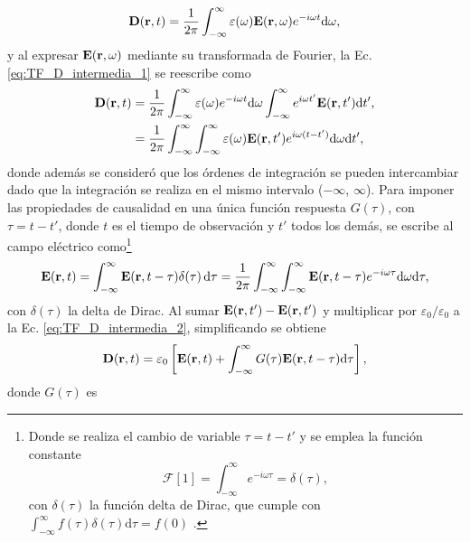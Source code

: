 %
\begin{equation}
	\vb{D}(\vb{r},t)=\frac{1}{2\pi}\int_{-\infty}^{\infty}\varepsilon(\omega)\vb{E}(\vb{r},\omega)e^{-i\omega t}\text{d}\omega,\label{eq:TF_D_intermedia_1}
\end{equation}
%
y al expresar $\vb{E}(\vb{r},\omega)$ mediante su transformada de Fourier, la Ec. \eqref{eq:TF_D_intermedia_1} se reescribe como
%
\begin{align}
	\vb{D}(\vb{r},t)&=\frac{1}{2\pi}\int_{-\infty}^{\infty}\varepsilon(\omega)e^{-i\omega t}\text{d}\omega\int_{-\infty}^{\infty}e^{i\omega t'}\vb{E}(\vb{r},t')\text{d}t',\\
	&=\frac{1}{2\pi}\int_{-\infty}^{\infty}\int_{-\infty}^{\infty}\varepsilon(\omega)\vb{E}(\vb{r},t') e^{i\omega (t-t')} \text{d}\omega \text{d}t',
	\label{eq:TF_D_intermedia_2}
\end{align}
%
donde además se consideró que los órdenes de integración se pueden intercambiar dado que la integración se realiza en el mismo intervalo ($-\infty$, $\infty$). Para imponer las propiedades de causalidad en una única función respuesta $G(\tau)$, con $\tau = t - t'$, donde $t$ es el tiempo de observación y $t'$ todos los demás, se escribe al campo eléctrico como\footnote{Donde se realiza el cambio de variable $\tau = t - t'$ y se emplea la función constante \cite{arfkenMathematicalMethodsPhysicists2011}
\begin{equation}
	\mathscr{F}[1]=\int_{-\infty}^{\infty}e^{-i\omega\tau}=\delta(\tau),
	\end{equation}
%
con $\delta(\tau)$ la función delta de Dirac, que cumple con $\int_{-\infty}^{\infty}f(\tau)\delta(\tau)\text{d}\tau=f(0)$ \cite{arfkenMathematicalMethodsPhysicists2011}.
}
\begin{equation}
	\vb{E}(\vb{r},t)=\int_{-\infty}^{\infty}\vb{E}(\vb{r},t-\tau)\delta(\tau)\dd{\tau}=\frac{1}{2\pi}\int_{-\infty}^{\infty}\int_{-\infty}^{\infty}\vb{E}(\vb{r},t-\tau)e^{-i\omega\tau}\text{d}\omega\text{d}\tau,
\end{equation}
%
con $\delta(\tau)$ la delta de Dirac. Al sumar $\vb{E}(\vb{r},t')-\vb{E}(\vb{r},t')$ y multiplicar por $\varepsilon_0/\varepsilon_0$ a la Ec. \eqref{eq:TF_D_intermedia_2}, simplificando se obtiene
%
\begin{equation}
	\vb{D}(\vb{r},t)=\varepsilon_0\left[\vb{E}(\vb{r},t)+\int_{-\infty}^{\infty}G(\tau)\vb{E}(\vb{r},t-\tau)\text{d}\tau\right],\label{eq:TF_D_final} 
\end{equation}
%
\noindent donde $G(\tau)$ es \cite{jacksonClassicalElectrodynamics2021}
